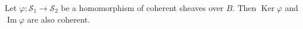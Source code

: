 Let $\varphi: \mathcal{S}_1 \rightarrow \mathcal{S}_2$ be a homomorphism of coherent sheaves over $B$. Then $\operatorname{Ker}\varphi$ and $\operatorname{Im}\varphi$ are also coherent.
